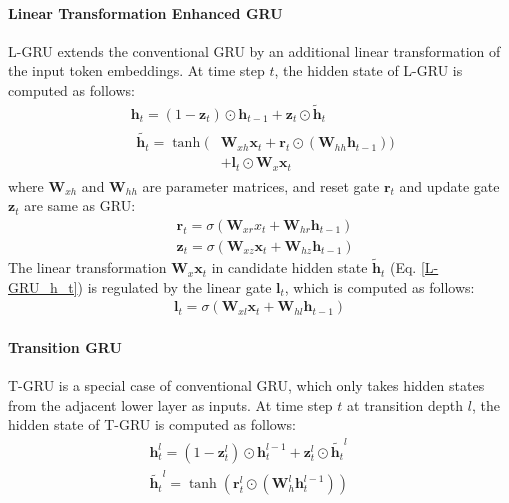 \documentclass[11pt,a4paper]{article}
\begin{document}
\paragraph{Linear Transformation Enhanced GRU}
L-GRU extends the conventional GRU by an additional linear transformation of the input token embeddings. At time step $t$, the hidden state of L-GRU is computed as follows:
\begin{align}
& \mathbf{h}_t = (1 - \mathbf{z}_t) \odot \mathbf{h}_{t-1} + \mathbf{z}_{ t } \odot \widetilde {\mathbf{h}}_t  \ \ \ \ \ \ \ \ \ \ \ \ \ \\
& \begin{aligned}
   \widetilde{\mathbf{h}_t} = \tanh ( & \mathbf{W}_{xh} \mathbf{x}_{t} + \mathbf{r}_{t}  \odot (\mathbf{W}_{hh} \mathbf{h}_{t-1})) \\ 
    & + \mathbf{l}_{t} \odot \mathbf{W}_x \mathbf{x}_t
  \end{aligned}
  \label{L-GRU_h_t}
\end{align}
where $\mathbf{W}_{xh}$ and $\mathbf{W}_{hh}$ are parameter matrices, and reset gate $\mathbf{r}_t$ and update gate $\mathbf{z}_t$ are same as GRU:
\begin{align}
& \mathbf{r}_t = \sigma (\mathbf{W}_{xr} x_t + \mathbf{W}_{hr} \mathbf{h}_{t-1} ) \\
& \mathbf{z}_t = \sigma (\mathbf{W}_{xz} \mathbf{x}_t + \mathbf{W}_{hz} \mathbf{h}_{t-1}) 
\end{align}
The linear transformation $\mathbf{W}_x \mathbf{x}_t$ in candidate hidden state $\widetilde{\mathbf{h}}_t$ (Eq. \ref{L-GRU_h_t}) is regulated by the linear gate $\mathbf{l}_t$, which is computed as follows:
\begin{align}
\mathbf{l}_t = \sigma (\mathbf{W}_{xl} \mathbf{x}_t + \mathbf{W}_{hl} \mathbf{h}_{t-1})
\end{align}
\paragraph{Transition GRU} T-GRU is a special case of conventional GRU, which only takes hidden states from the adjacent lower layer as inputs. At time step $t$ at transition depth $l$, the hidden state of T-GRU is computed as follows:
\begin{align}
  \mathbf{h}^{l}_{t} = (1 - \mathbf{z}^{l}_{t}) \odot \mathbf{h}^{l - 1}_{t} + \mathbf{z}^{l}_{t} \odot \widetilde {\mathbf{h}_{t}}^l \\
  \widetilde{\mathbf{h}_{t}}^l = \tanh (\mathbf{r}_{t}^l \odot (\mathbf{W}^{l}_{h} \mathbf{h}_{t}^{l-1})) \ \ \ \ \ \ \  
\end{align}
\end{document}
